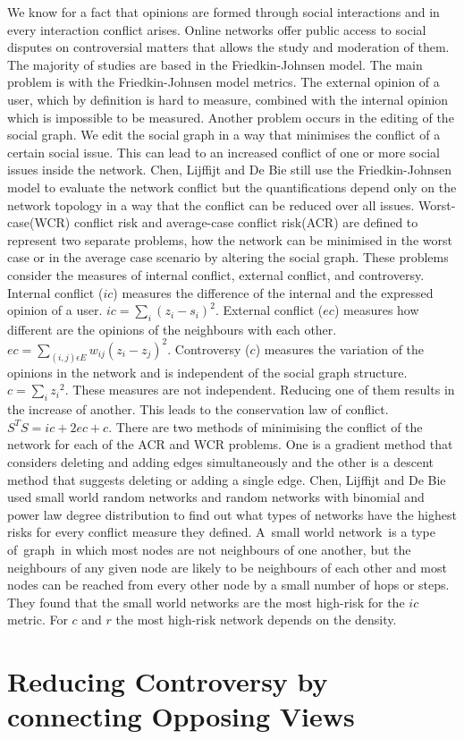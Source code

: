 We know for a fact that opinions are formed through social interactions and in every interaction conflict arises. Online networks offer public access to social disputes on controversial matters that allows the study and moderation of them. The majority of studies are based in the Friedkin-Johnsen model. The main problem is with the Friedkin-Johnsen model metrics. The external opinion of a user, which by definition is hard to measure, combined with the internal opinion which is impossible to be measured. Another problem occurs in the editing of the social graph. We edit the social graph in a way that minimises the conflict of a certain social issue. This can lead to an increased conflict of one or more social issues inside the network. Chen, Lijffijt and De Bie still use the Friedkin-Johnsen model to evaluate the network conflict but the quantifications depend only on the network topology in a way that the conflict can be reduced over all issues. Worst-case(WCR) conflict risk and average-case conflict risk(ACR) are defined to represent two separate problems, how the network can be minimised in the worst case or in the average case scenario by altering the social graph. These problems consider the measures of internal conflict, external conflict, and controversy. Internal conflict ($ic$) measures the difference of the internal and the expressed opinion of a user. $ic = \sum_i{(z_i-s_i)^2}.$ External conflict ($ec$) measures how different are the opinions of the neighbours with each other. $ec = \sum_{(i,j) \epsilon E}{w_{ij}(z_i-z_j)^2}.$ Controversy ($c$) measures the variation of the opinions in the network and is independent of the social graph structure. $c = \sum_i{z_i}^2.$ These measures are not independent. Reducing one of them results in the increase of another. This leads to the conservation law of conflict. $S^TS = ic + 2ec +  c.$ There are two methods of minimising the conflict of the network for each of the ACR and WCR problems. One is a gradient method that  considers deleting and adding edges simultaneously and the other is a descent method that suggests deleting or adding a single edge. Chen, Lijffijt and De Bie used small world random networks and random networks with binomial and power law degree distribution to find out what types of networks have the highest risks for every conflict measure they defined. A small world network is a type of graph in which most nodes are not neighbours of one another, but the neighbours of any given node are likely to be neighbours of each other and most nodes can be reached from every other node by a small number of hops or steps. They found that the small world networks are the most high-risk for the $ic$ metric. For $c$ and $r$ the most high-risk network depends on the density.\cite{chen}

\section{Reducing Controversy by connecting Opposing Views}
\label{sec:reducing}


